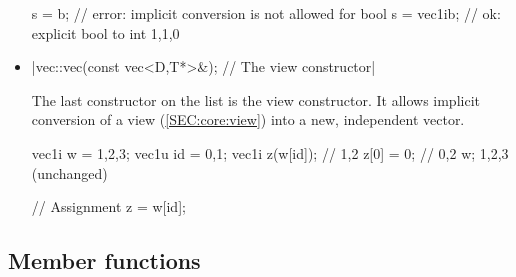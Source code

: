 \documentclass[12pt,a4paper]{report}
\newenvironment{example}
{
    \begin{mdframed}[style=example,frametitle={Example}]
}
{
    \end{mdframed}
}
\begin{document}
\begin{itemize}
\begin{example}
\begin{cppcode}
s = b;        // error: implicit conversion is not allowed for bool
s = vec1i{b}; // ok: explicit bool to int {1,1,0}
\end{cppcode}
\end{example}

\item \cppinline|vec::vec(const vec<D,T*>&); // The view constructor|

The last constructor on the list is the view constructor. It allows implicit conversion of a view (\ref{SEC:core:view}) into a new, independent vector.

\begin{example}
\begin{cppcode}
vec1i w = {1,2,3};
vec1u id = {0,1};
vec1i z(w[id]); // {1,2}
z[0] = 0; // {0,2}
w; {1,2,3} (unchanged)

// Assignment
z = w[id];
\end{cppcode}
\end{example}

\end{itemize}

\subsection{Member functions \label{SEC:core:vec:member_fun}}
\end{document}
